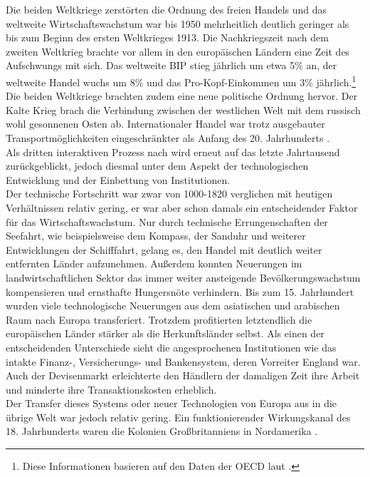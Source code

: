 %
Die beiden Weltkriege zerstörten die Ordnung des freien Handels und das weltweite Wirtschaftswachstum war bis 1950 mehrheitlich deutlich geringer als bis zum Beginn des ersten Weltkrieges 1913. Die Nachkriegszeit nach dem zweiten Weltkrieg brachte vor allem in den europäischen Ländern eine Zeit des Aufschwungs mit sich. Das weltweite BIP stieg jährlich um etwa 5{\%} an, der weltweite Handel wuchs um 8{\%} und das Pro-Kopf-Einkommen um 3{\%} jährlich.\footnote{Diese Informationen basieren auf den Daten der OECD laut \cite{Maddison.2001}.} Die beiden Weltkriege brachten zudem eine neue politische Ordnung hervor. Der Kalte Krieg brach die Verbindung zwischen der westlichen Welt mit dem russisch wohl gesonnenen Osten ab. Internationaler Handel war trotz ausgebauter Transportmöglichkeiten eingeschränkter als Anfang des 20. Jahrhunderts \cite[S. 20-24]{Maddison.2001}.\\
%
Als dritten interaktiven Prozess nach \cite{Maddison.2001} wird erneut auf das letzte Jahrtausend zurückgeblickt, jedoch diesmal unter dem Aspekt der technologischen Entwicklung und der Einbettung von Institutionen. \\
%
Der technische Fortschritt war zwar von 1000-1820 verglichen mit heutigen Verhältnissen relativ gering, er war aber schon damals ein entscheidender Faktor für das Wirtschaftswachstum. Nur durch technische Errungenschaften der Seefahrt, wie beispielsweise dem Kompass, der Sanduhr und  weiterer Entwicklungen der Schifffahrt, gelang es, den Handel mit deutlich weiter entfernten Länder aufzunehmen. Außerdem konnten Neuerungen im landwirtschaftlichen Sektor das immer weiter ansteigende Bevölkerungswachstum kompensieren und ernsthafte Hungersnöte verhindern. Bis zum 15. Jahrhundert wurden viele technologische Neuerungen aus dem asiatischen und arabischen Raum nach Europa transferiert. Trotzdem profitierten letztendlich die europäischen Länder stärker als die Herkunftsländer selbst. Als einen der entscheidenden Unterschiede sieht \cite{Maddison.2001} die angesprochenen Institutionen wie das intakte Finanz-, Versicherungs- und Bankensystem, deren Vorreiter England war. Auch der Devisenmarkt erleichterte den Händlern der damaligen Zeit ihre Arbeit und minderte ihre Transaktionskosten erheblich. \\
%
Der Transfer dieses Systems oder neuer Technologien von Europa aus in die übrige Welt war jedoch relativ gering. Ein funktionierender Wirkungskanal des 18. Jahrhunderts waren die Kolonien Großbritanniens in Nordamerika \cite[S. 27]{Maddison.2001}.\\

